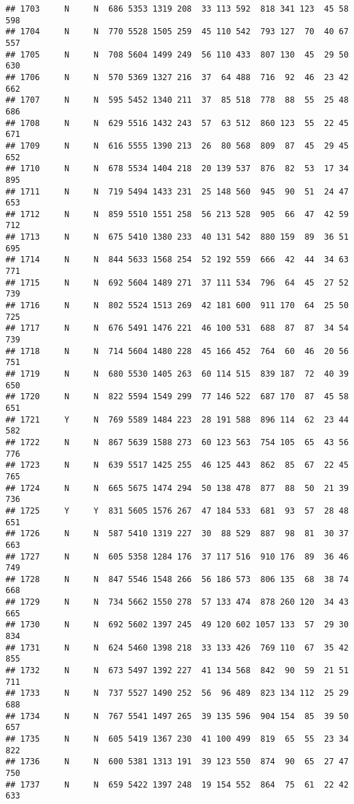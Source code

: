 \documentclass[]{article}
\begin{document}
\begin{verbatim}
## 1703     N     N  686 5353 1319 208  33 113 592  818 341 123  45 58  598
## 1704     N     N  770 5528 1505 259  45 110 542  793 127  70  40 67  557
## 1705     N     N  708 5604 1499 249  56 110 433  807 130  45  29 50  630
## 1706     N     N  570 5369 1327 216  37  64 488  716  92  46  23 42  662
## 1707     N     N  595 5452 1340 211  37  85 518  778  88  55  25 48  686
## 1708     N     N  629 5516 1432 243  57  63 512  860 123  55  22 45  671
## 1709     N     N  616 5555 1390 213  26  80 568  809  87  45  29 45  652
## 1710     N     N  678 5534 1404 218  20 139 537  876  82  53  17 34  895
## 1711     N     N  719 5494 1433 231  25 148 560  945  90  51  24 47  653
## 1712     N     N  859 5510 1551 258  56 213 528  905  66  47  42 59  712
## 1713     N     N  675 5410 1380 233  40 131 542  880 159  89  36 51  695
## 1714     N     N  844 5633 1568 254  52 192 559  666  42  44  34 63  771
## 1715     N     N  692 5604 1489 271  37 111 534  796  64  45  27 52  739
## 1716     N     N  802 5524 1513 269  42 181 600  911 170  64  25 50  725
## 1717     N     N  676 5491 1476 221  46 100 531  688  87  87  34 54  739
## 1718     N     N  714 5604 1480 228  45 166 452  764  60  46  20 56  751
## 1719     N     N  680 5530 1405 263  60 114 515  839 187  72  40 39  650
## 1720     N     N  822 5594 1549 299  77 146 522  687 170  87  45 58  651
## 1721     Y     N  769 5589 1484 223  28 191 588  896 114  62  23 44  582
## 1722     N     N  867 5639 1588 273  60 123 563  754 105  65  43 56  776
## 1723     N     N  639 5517 1425 255  46 125 443  862  85  67  22 45  765
## 1724     N     N  665 5675 1474 294  50 138 478  877  88  50  21 39  736
## 1725     Y     Y  831 5605 1576 267  47 184 533  681  93  57  28 48  651
## 1726     N     N  587 5410 1319 227  30  88 529  887  98  81  30 37  663
## 1727     N     N  605 5358 1284 176  37 117 516  910 176  89  36 46  749
## 1728     N     N  847 5546 1548 266  56 186 573  806 135  68  38 74  668
## 1729     N     N  734 5662 1550 278  57 133 474  878 260 120  34 43  665
## 1730     N     N  692 5602 1397 245  49 120 602 1057 133  57  29 30  834
## 1731     N     N  624 5460 1398 218  33 133 426  769 110  67  35 42  855
## 1732     N     N  673 5497 1392 227  41 134 568  842  90  59  21 51  711
## 1733     N     N  737 5527 1490 252  56  96 489  823 134 112  25 29  688
## 1734     N     N  767 5541 1497 265  39 135 596  904 154  85  39 50  657
## 1735     N     N  605 5419 1367 230  41 100 499  819  65  55  23 34  822
## 1736     N     N  600 5381 1313 191  39 123 550  874  90  65  27 47  750
## 1737     N     N  659 5422 1397 248  19 154 552  864  75  61  22 42  633

\end{verbatim}
\end{document}
